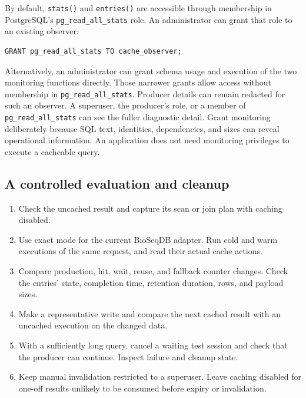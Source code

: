 By default, \texttt{stats()} and \texttt{entries()} are accessible through
membership in PostgreSQL's \texttt{pg\_read\_all\_stats} role.
An administrator can grant that role to an existing observer:

\par\noindent\begin{minipage}{\linewidth}
\begin{lstlisting}[style=bioseq-appendix-sql,
  caption={Grant the default monitoring role.}]
GRANT pg_read_all_stats TO cache_observer;
\end{lstlisting}
\end{minipage}

Alternatively, an administrator can grant schema usage and execution of the
two monitoring functions directly. Those narrower grants allow access without
membership in \texttt{pg\_read\_all\_stats}. Producer details can remain
redacted for such an observer. A superuser, the producer's role, or a member
of \texttt{pg\_read\_all\_stats} can see the fuller diagnostic detail.
Grant monitoring deliberately because SQL text, identities, dependencies,
and sizes can reveal operational information. An application does not need
monitoring privileges to execute a cacheable query.

\subsection{A controlled evaluation and cleanup}

\begin{enumerate}
  \item Check the uncached result and capture its scan or join plan with
    caching disabled.
  \item Use exact mode for the current BioSeqDB adapter. Run cold and warm
    executions of the same request, and read their actual cache actions.
  \item Compare production, hit, wait, reuse, and fallback counter changes.
    Check the entries' state, completion time, retention duration, rows,
    and payload sizes.
  \item Make a representative write and compare the next cached result
    with an uncached execution on the changed data.
  \item With a sufficiently long query, cancel a waiting test session and
    check that the producer can continue. Inspect failure and cleanup state.
  \item Keep manual invalidation restricted to a superuser. Leave caching
    disabled for one-off results unlikely to be consumed before expiry or
    invalidation.
\end{enumerate}

